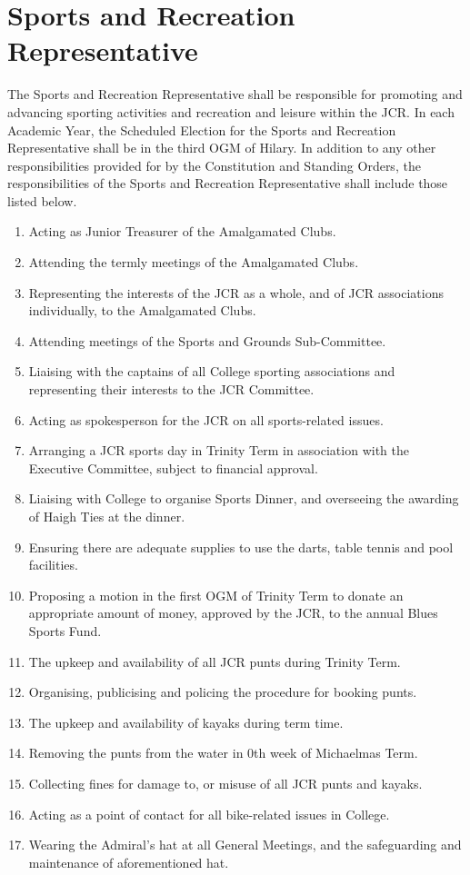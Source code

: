 \section{Sports and Recreation Representative}
\npara The Sports and Recreation Representative shall be responsible for promoting and advancing sporting activities and recreation and leisure within the JCR. 
\npara In each Academic Year, the Scheduled Election for the Sports and Recreation Representative shall be in the third OGM of Hilary.
\npara In addition to any other responsibilities provided for by the Constitution and Standing Orders, the responsibilities of the Sports and Recreation Representative shall include those listed below.
\begin{enumerate}
	\item Acting as Junior Treasurer of the Amalgamated Clubs.
	\item Attending the termly meetings of the Amalgamated Clubs.
	\item Representing the interests of the JCR as a whole, and of JCR associations individually, to the Amalgamated Clubs.
	\item Attending meetings of the Sports and Grounds Sub-Committee.
	\item Liaising with the captains of all College sporting associations and representing their interests to the JCR Committee.
	\item Acting as spokesperson for the JCR on all sports-related issues.
	\item Arranging a JCR sports day in Trinity Term in association with the Executive Committee, subject to financial approval.
	\item Liaising with College to organise Sports Dinner, and overseeing the awarding of Haigh Ties at the dinner.
	\item Ensuring there are adequate supplies to use the darts, table tennis and pool facilities.
	\item Proposing a motion in the first OGM of Trinity Term to donate an appropriate amount of money, approved by the JCR, to the annual Blues Sports Fund.
	\item The upkeep and availability of all JCR punts during Trinity Term.
	\item Organising, publicising and policing the procedure for booking punts.
	\item The upkeep and availability of kayaks during term time.
	\item Removing the punts from the water in 0th week of Michaelmas Term.
	\item Collecting fines for damage to, or misuse of all JCR punts and kayaks.
	\item Acting as a point of contact for all bike-related issues in College.
	\item Wearing the Admiral's hat at all General Meetings, and the safeguarding and maintenance of aforementioned hat.
\end{enumerate}
